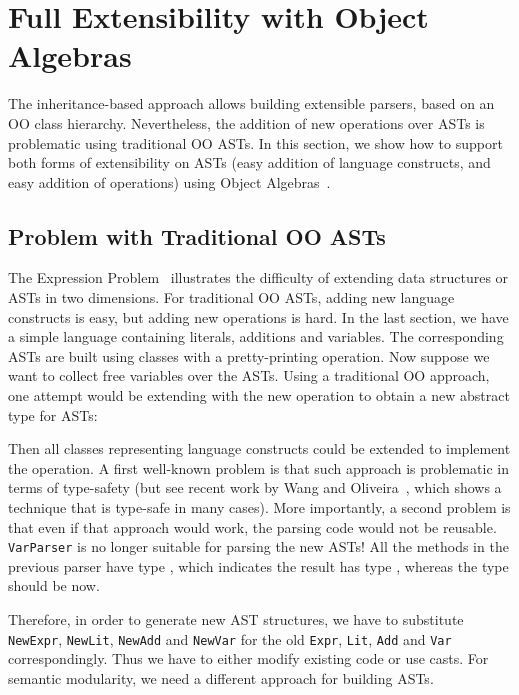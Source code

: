 \section{Full Extensibility with Object Algebras}\label{sec:algebrasandparsing}

The inheritance-based approach allows building extensible parsers, based on an OO class hierarchy.  Nevertheless, the addition of new operations over ASTs is problematic using traditional OO ASTs. In this section, we
show how to support both forms of extensibility on ASTs (easy
addition of language constructs, and easy addition of operations)
using Object Algebras~\cite{Oliveira:2012}.

\subsection{Problem with Traditional OO ASTs}\label{subsec:problemwithoutoa}

The Expression Problem~\cite{wadler1998expression} illustrates the
difficulty of extending data structures or ASTs in two dimensions. For
traditional OO ASTs, adding new language constructs is easy, but
adding new operations is hard. In the last section, we have a simple
language containing literals, additions and variables. The
corresponding ASTs are built using classes with a pretty-printing
operation. Now suppose we want to collect free variables over the
ASTs. Using a traditional OO approach, one attempt would be extending
 with the new operation to obtain a new abstract type
for ASTs:


\noindent Then all classes representing language constructs could be
extended to implement the operation. A first well-known problem is that such
approach is problematic in terms of type-safety (but see recent work
by Wang and Oliveira~\cite{wang2016expression}, which shows a technique that is type-safe
in many cases). More importantly, a second problem is that
even if that approach would work, the parsing code would not
be reusable. \lstinline{VarParser} is no longer suitable for parsing the new ASTs! All the methods in the previous parser have type , which indicates the result has type , whereas the type should be  now.

Therefore, in order to generate new AST structures, we have to
substitute \lstinline{NewExpr}, \lstinline{NewLit},
\lstinline{NewAdd} and \lstinline{NewVar} for the old
\lstinline{Expr}, \lstinline{Lit}, \lstinline{Add} and \lstinline{Var}
correspondingly. Thus we have to either modify existing code or
use casts. For semantic modularity, we need a different approach for building ASTs.

